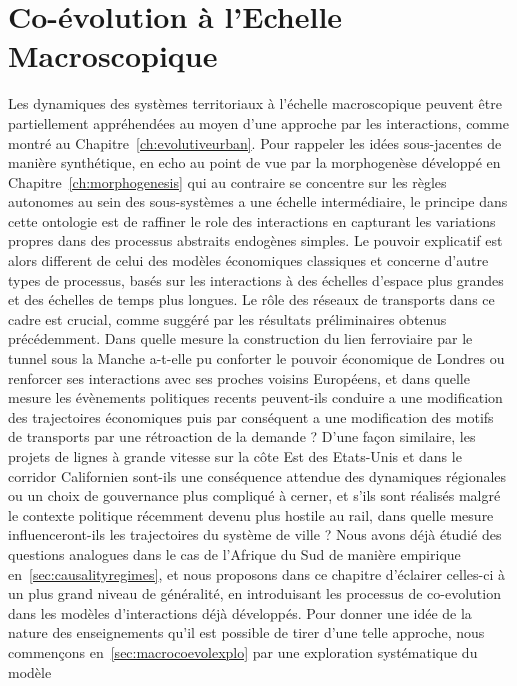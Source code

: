 
\chapter{Co-évolution à l'Echelle Macroscopique}


\label{ch:macrocoevolution} 




Les dynamiques des systèmes territoriaux à l'échelle macroscopique peuvent être partiellement appréhendées au moyen d'une approche par les interactions, comme montré au Chapitre~\ref{ch:evolutiveurban}. Pour rappeler les idées sous-jacentes de manière synthétique, en echo au point de vue par la morphogenèse développé en Chapitre~\ref{ch:morphogenesis} qui au contraire se concentre sur les règles autonomes au sein des sous-systèmes a une échelle intermédiaire, le principe dans cette ontologie est de raffiner le role des interactions en capturant les variations propres dans des processus abstraits endogènes simples. Le pouvoir explicatif est alors different de celui des modèles économiques classiques et concerne d'autre types de processus, basés sur les interactions à des échelles d'espace plus grandes et des échelles de temps plus longues. Le rôle des réseaux de transports dans ce cadre est crucial, comme suggéré par les résultats préliminaires obtenus précédemment. Dans quelle mesure la construction du lien ferroviaire par le tunnel sous la Manche a-t-elle pu conforter le pouvoir économique de Londres ou renforcer ses interactions avec ses proches voisins Européens, et dans quelle mesure les évènements politiques recents peuvent-ils conduire a une modification des trajectoires économiques puis par conséquent a une modification des motifs de transports par une rétroaction de la demande ? D'une façon similaire, les projets de lignes à grande vitesse sur la côte Est des Etats-Unis et dans le corridor Californien sont-ils une conséquence attendue des dynamiques régionales ou un choix de gouvernance plus compliqué à cerner, et s'ils sont réalisés malgré le contexte politique récemment devenu plus hostile au rail, dans quelle mesure influenceront-ils les trajectoires du système de ville ? Nous avons déjà étudié des questions analogues dans le cas de l'Afrique du Sud de manière empirique en~\ref{sec:causalityregimes}, et nous proposons dans ce chapitre d'éclairer celles-ci à un plus grand niveau de généralité, en introduisant les processus de co-evolution dans les modèles d'interactions déjà développés. Pour donner une idée de la nature des enseignements qu'il est possible de tirer d'une telle approche, nous commençons en~\ref{sec:macrocoevolexplo} par une exploration systématique du modèle 